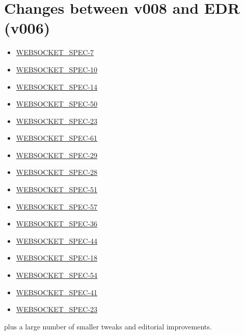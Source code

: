\section*{Changes between v008 and EDR (v006)}
\begin{itemize}
\item \href {http://java.net/jira/browse/WEBSOCKET_SPEC-7}{WEBSOCKET\_SPEC-7}
\item \href {http://java.net/jira/browse/WEBSOCKET_SPEC-10}{WEBSOCKET\_SPEC-10}
\item \href {http://java.net/jira/browse/WEBSOCKET_SPEC-14}{WEBSOCKET\_SPEC-14}
\item \href {http://java.net/jira/browse/WEBSOCKET_SPEC-50}{WEBSOCKET\_SPEC-50}
\item \href {http://java.net/jira/browse/WEBSOCKET_SPEC-23}{WEBSOCKET\_SPEC-23}
\item \href {http://java.net/jira/browse/WEBSOCKET_SPEC-61}{WEBSOCKET\_SPEC-61}
\item \href {http://java.net/jira/browse/WEBSOCKET_SPEC-29}{WEBSOCKET\_SPEC-29}
\item \href {http://java.net/jira/browse/WEBSOCKET_SPEC-28}{WEBSOCKET\_SPEC-28}
\item \href {http://java.net/jira/browse/WEBSOCKET_SPEC-51}{WEBSOCKET\_SPEC-51}
\item \href {http://java.net/jira/browse/WEBSOCKET_SPEC-57}{WEBSOCKET\_SPEC-57}
\item \href {http://java.net/jira/browse/WEBSOCKET_SPEC-36}{WEBSOCKET\_SPEC-36}
\item \href {http://java.net/jira/browse/WEBSOCKET_SPEC-44}{WEBSOCKET\_SPEC-44}
\item \href {http://java.net/jira/browse/WEBSOCKET_SPEC-18}{WEBSOCKET\_SPEC-18}
\item \href {http://java.net/jira/browse/WEBSOCKET_SPEC-54}{WEBSOCKET\_SPEC-54}
\item \href {http://java.net/jira/browse/WEBSOCKET_SPEC-41}{WEBSOCKET\_SPEC-41}
\item \href {http://java.net/jira/browse/WEBSOCKET_SPEC-23}{WEBSOCKET\_SPEC-23}
\end{itemize}

plus a large number of smaller tweaks and editorial improvements.